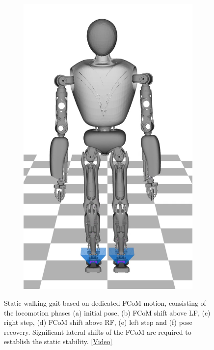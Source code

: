 \begin{figure}
\begin{subfigure}{.16\textwidth}
	\includegraphics[width=1\linewidth]{fig/walkStatic/snaps/9}
	\caption{}
\end{subfigure}
\caption[Static walking based on dedicated \gls{FCoM} shifting]{Static walking gait based on dedicated \gls{FCoM} motion, consisting of the locomotion phases (a) initial pose, (b) \gls{FCoM} shift above \gls{LF}, (c) right step, (d) \gls{FCoM} shift above \gls{RF}, (e) left step and (f) pose recovery. Significant lateral shifts of the \gls{FCoM} are required to establish the static stability. \href{https://github.com/julesser/ma-thesis-simulation-results/blob/master/HumanoidFixedArms/StaticWalking_NoCoPCost_ComHeightConstant/crocoddyl.mp4}{[Video]}}
\label{fig:walkStatic_Snaps}
\end{figure}

